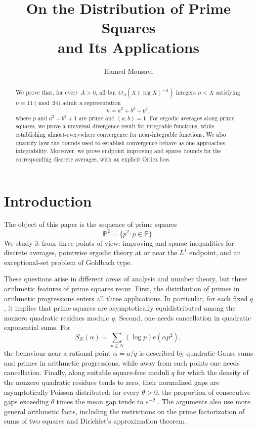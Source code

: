 \documentclass[12pt,reqno]{amsart}
\title[Prime Squares and Their Applications]
{On the Distribution of Prime Squares \\ and Its Applications}
\author[H. Mousavi]{Hamed Mousavi}
\date{}
\numberwithin{equation}{section}
\theoremstyle{definition}
\theoremstyle{remark}
\begin{document}
\begin{abstract}
We prove that, for every \(A>0\), all but
\(O_A(X(\log X)^{-A})\) integers \(n<X\) satisfying
\(n\equiv11\pmod{24}\) admit a representation
\[
 n=a^2+b^2+p^2,
\]
where \(p\) and \(a^2+b^2+1\) are prime and \((a,b)=1\).
For ergodic averages along prime squares, we prove a universal
divergence result for integrable functions, while establishing
almost-everywhere convergence for near-integrable functions.
We also quantify how the bounds used to establish convergence behave as one approaches integrability. Moreover, we  prove endpoint improving and sparse bounds for
the corresponding discrete averages, with an explicit Orlicz loss.
\end{abstract}

\maketitle
\tableofcontents




\section{Introduction}\label{s:intro}





The object of this paper is the sequence of prime squares
\[
 \mathbb P^2=\{p^2:p\in\mathbb P\}.
\]
We study it from three points of view: improving and sparse inequalities
for discrete averages, pointwise ergodic theory at or near the $L^1$ endpoint,
and an exceptional-set problem of Goldbach type.


These questions arise in different areas of analysis and number theory,
but three arithmetic features of prime squares recur.  First, the
distribution of primes in arithmetic progressions enters all three
applications.  In particular, for each fixed \(q\), it implies that
prime squares are asymptotically equidistributed among the nonzero
quadratic residues modulo \(q\).  Second, one needs cancellation in
quadratic exponential sums.  For
\[
 S_N(\alpha)=\sum_{p\leq N}(\log p)e(\alpha p^2),
\]
the behaviour near a rational point \(\alpha=a/q\) is described by
quadratic Gauss sums and primes in arithmetic progressions, while away
from such points one needs cancellation.  Finally, along suitable square-free moduli \(q\) for which the density
of the nonzero quadratic residues tends to zero, their normalized gaps
are asymptotically Poisson distributed: for every \(\theta>0\), the
proportion of consecutive gaps exceeding \(\theta\) times the mean gap
tends to \(e^{-\theta}\) \cite{GK08}.    The arguments also use more general arithmetic facts, including
the restrictions on the prime factorization of sums of two squares
and Dirichlet's approximation theorem.
\end{document}
